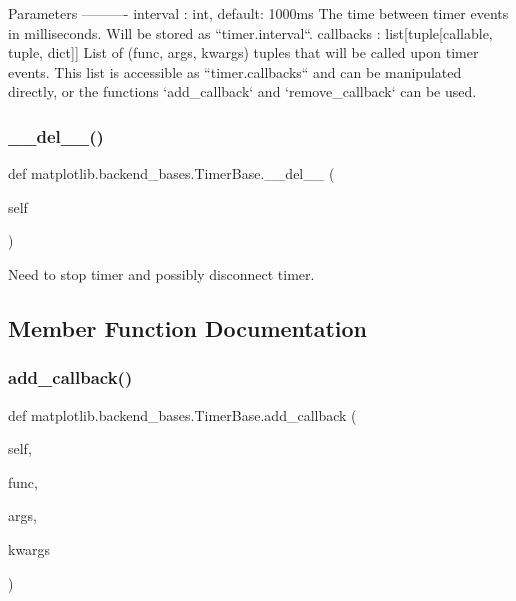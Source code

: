\begin{DoxyVerb}Parameters
----------
interval : int, default: 1000ms
    The time between timer events in milliseconds.  Will be stored as
    ``timer.interval``.
callbacks : list[tuple[callable, tuple, dict]]
    List of (func, args, kwargs) tuples that will be called upon
    timer events.  This list is accessible as ``timer.callbacks`` and
    can be manipulated directly, or the functions `add_callback` and
    `remove_callback` can be used.
\end{DoxyVerb}
 \mbox{\label{classmatplotlib_1_1backend__bases_1_1TimerBase_a152a5a66ba075701ed935b2b2428f9e0}} 
\subsubsection{\texorpdfstring{\+\_\+\+\_\+del\+\_\+\+\_\+()}{\_\_del\_\_()}}
{\footnotesize\ttfamily def matplotlib.\+backend\+\_\+bases.\+Timer\+Base.\+\_\+\+\_\+del\+\_\+\+\_\+ (\begin{DoxyParamCaption}\item[{}]{self }\end{DoxyParamCaption})}

\begin{DoxyVerb}Need to stop timer and possibly disconnect timer.\end{DoxyVerb}
 

\subsection{Member Function Documentation}
\mbox{\label{classmatplotlib_1_1backend__bases_1_1TimerBase_a8ad446b09f04c87ee93d440e1079885d}} 
\subsubsection{\texorpdfstring{add\+\_\+callback()}{add\_callback()}}
{\footnotesize\ttfamily def matplotlib.\+backend\+\_\+bases.\+Timer\+Base.\+add\+\_\+callback (\begin{DoxyParamCaption}\item[{}]{self,  }\item[{}]{func,  }\item[{}]{args,  }\item[{}]{kwargs }\end{DoxyParamCaption})}

